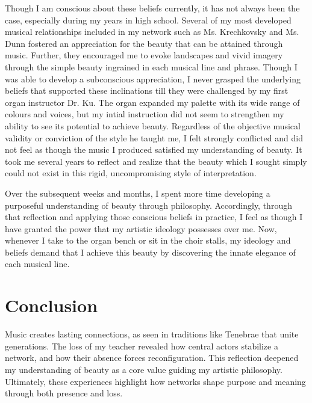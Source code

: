 \documentclass{article} %
\begin{document}
\begin{multicols}{2}
Though I am conscious about these beliefs currently, it has not always been the case, especially during my years in high school.
Several of my most developed musical relationships included in my network such as Ms. Krechkovsky and Ms. Dunn fostered an appreciation for the beauty that can be attained through music.
Further, they encouraged me to evoke landscapes and vivid imagery through the simple beauty ingrained in each musical line and phrase.
Though I was able to develop a subconscious appreciation, I never grasped the underlying beliefs that supported these inclinations till they were challenged by my first organ instructor Dr. Ku.
The organ expanded my palette with its wide range of colours and voices, but my intial instruction did not seem to strengthen my ability to see its potential to achieve beauty.
Regardless of the objective musical validity or conviction of the style he taught me, I felt strongly conflicted and did not feel as though the music I produced satisfied my understanding of beauty.
It took me several years to reflect and realize that the beauty which I sought simply could not exist in this rigid, uncompromising style of interpretation.

Over the subsequent weeks and months, I spent more time developing a purposeful understanding of beauty through philosophy.
Accordingly, through that reflection and applying those conscious beliefs in practice, I feel as though I have granted the power that my artistic ideology possesses over me.
Now, whenever I take to the organ bench or sit in the choir stalls, my ideology and beliefs demand that I achieve this beauty by discovering the innate elegance of each musical line.

\section{Conclusion}

Music creates lasting connections, as seen in traditions like Tenebrae that unite generations. 
The loss of my teacher revealed how central actors stabilize a network, and how their absence forces reconfiguration. 
This reflection deepened my understanding of beauty as a core value guiding my artistic philosophy. 
Ultimately, these experiences highlight how networks shape purpose and meaning through both presence and loss.


%
%

\end{multicols}

\label{last_page}
\end{document}
